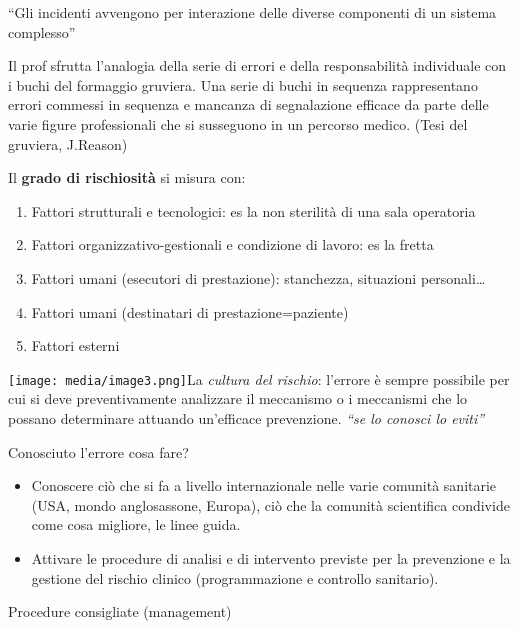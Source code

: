 \documentclass[]{article}
\begin{document}
``Gli incidenti avvengono per interazione delle diverse componenti di un
sistema complesso''

Il prof sfrutta l'analogia della serie di errori e della responsabilità
individuale con i buchi del formaggio gruviera. Una serie di buchi in
sequenza rappresentano errori commessi in sequenza e mancanza di
segnalazione efficace da parte delle varie figure professionali che si
susseguono in un percorso medico. (Tesi del gruviera, J.Reason)

Il \textbf{grado di rischiosità} si misura con:

\begin{enumerate}
\def\labelenumi{\arabic{enumi}.}
\item
  Fattori strutturali e tecnologici: es la non sterilità di una sala
  operatoria
\item
  Fattori organizzativo-gestionali e condizione di lavoro: es la fretta
\item
  Fattori umani (esecutori di prestazione): stanchezza, situazioni
  personali\ldots{}
\item
  Fattori umani (destinatari di prestazione=paziente)
\item
  Fattori esterni
\end{enumerate}

\texttt{[image: media/image3.png]}La
\emph{cultura del rischio}: l'errore è sempre possibile per cui si deve
preventivamente analizzare il meccanismo o i meccanismi che lo possano
determinare attuando un'efficace prevenzione. \emph{``se lo conosci lo
eviti''}

Conosciuto l'errore cosa fare?

\begin{itemize}
\item
  Conoscere ciò che si fa a livello internazionale nelle varie comunità
  sanitarie (USA, mondo anglosassone, Europa), ciò che la comunità
  scientifica condivide come cosa migliore, le linee guida.
\item
  Attivare le procedure di analisi e di intervento previste per la
  prevenzione e la gestione del rischio clinico (programmazione e
  controllo sanitario).
\end{itemize}

Procedure consigliate (management)
\end{document}
